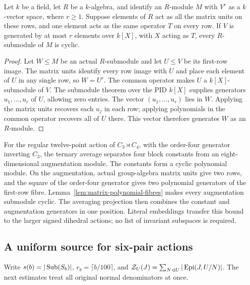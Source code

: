 \begin{lemma}
\label{lem:matrix-polynomial-fibres}
Let $k$ be a field, let $R$ be a $k$-algebra, and identify an
$R$-module $M$ with $V^r$ as a $k$-vector space, where $r\geq1$.
Suppose elements of $R$ act as all the matrix units on these rows,
and one element acts as the same operator $T$ on every row.
If $V$ is generated by at most $r$ elements over $k[X]$, with
$X$ acting as $T$, every $R$-submodule of $M$ is cyclic.
\end{lemma}
\begin{proof}
Let $W\leq M$ be an actual $R$-submodule and let $U\leq V$
be its first-row image. The matrix units identify every row image
with $U$ and place each element of $U$ in any single row, so
$W=U^r$. The common operator makes $U$ a $k[X]$-submodule of $V$.
The submodule theorem over the PID $k[X]$ supplies generators
$u_1,\ldots,u_r$ of $U$, allowing zero entries.
The vector $(u_1,\ldots,u_r)$ lies in $W$. Applying the matrix units
recovers each $u_j$ in each row; applying polynomials in the common
operator recovers all of $U$ there. This vector therefore generates
$W$ as an $R$-module.
\end{proof}

For the regular twelve-point action of $C_3\rtimes C_4$, with the
order-four generator inverting $C_3$, the ternary average separates
four block constants from an eight-dimensional augmentation module.
The constants form a cyclic polynomial module. On the augmentation,
actual group-algebra matrix units give two rows, and the square of
the order-four generator gives two polynomial generators of the
first-row fibre. Lemma~\ref{lem:matrix-polynomial-fibres} makes every
augmentation submodule cyclic. The averaging projection then combines
the constant and augmentation generators in one position. Literal
embeddings transfer this bound to the larger signed dihedral actions;
no list of invariant subspaces is required.

\subsection{A uniform source for six-pair actions}

Write $s(b)=|\operatorname{Sub}(S_b)|$, $r_b=\lceil b/100\rceil$, and
$\mathcal Z_U(J)=\sum_{N\lhd U}|\operatorname{Epi}(J,U/N)|$.
The next estimates treat all original normal denominators at once.

